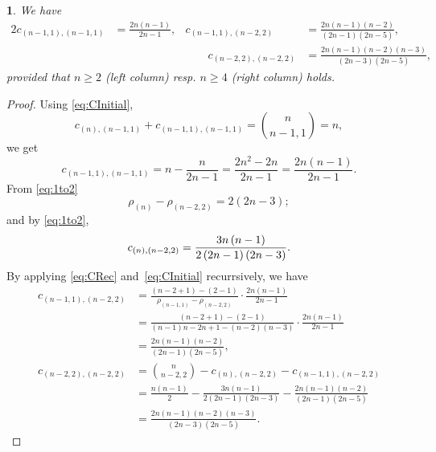 \documentclass[10pt,oneside,american]{amsart}
\numberwithin{equation}{section}
\numberwithin{figure}{section}
\theoremstyle{definition}
\theoremstyle{remark}
\theoremstyle{plain}
\theoremstyle{definition}
\theoremstyle{plain}
\newtheorem{thm}{\protect\theoremname}[section]
\theoremstyle{plain}
\theoremstyle{plain}
\providecommand{\theoremname}{Theorem}
\begin{document}
\begin{thm}
\label{thm:fam1}
We have
\begin{alignat*}{2}
  c_{(n-1,1),(n-1,1)} &= \frac{2n(n-1)}{2n-1}, &
  c_{(n-1,1),(n-2,2)} &= \frac{2n(n-1)(n-2)}{(2n-1)(2n-5)}, \\
  &&\qquad
  c_{(n-2,2),(n-2,2)} &= \frac{2n(n-1)(n-2)(n-3)}{(2n-3)(2n-5)},
\end{alignat*}
provided that $n\geq2$ (left column) resp. $n\geq4$ (right column) holds.
\end{thm}
\begin{proof}
Using \eqref{eq:CInitial},
\[
  c_{\left(n\right),\left(n-1,1\right)}+c_{\left(n-1,1\right),\left(n-1,1\right)}=\binom{n}{n-1,1}=n,
\]
we get
\[
  c_{\left(n-1,1\right),\left(n-1,1\right)}=n-\frac{n}{2n-1}=\frac{2n^{2}-2n}{2n-1}=\frac{2n\left(n-1\right)}{2n-1}.
\]
From \eqref{eq:1to2} 
\[
  \rho_{\left(n\right)}-\rho_{\left(n-2,2\right)} =2\left(2n-3\right);
\]
and by \eqref{eq:1to2}, 
\[
 c_{\left(n\right),\left(n-2,2\right)} =\frac{3n\left(n-1\right)}{2\left(2n-1\right)\left(2n-3\right)}.\\
\]
By applying \eqref{eq:CRec} and~\eqref{eq:CInitial} recurrsively, we have
\begin{align*}
  c_{\left(n-1,1\right),\left(n-2,2\right)}
  &= \frac{\left(n-2+1\right)-\left(2-1\right)}{\rho_{\left(n-1,1\right)}-\rho_{\left(n-2,2\right)}}\cdot\frac{2n\left(n-1\right)}{2n-1}\\
  &= \frac{\left(n-2+1\right)-\left(2-1\right)}{\left(n-1\right)n-2n+1-\left(n-2\right)\left(n-3\right)}\cdot\frac{2n\left(n-1\right)}{2n-1}\\
  &= \frac{2n\left(n-1\right)\left(n-2\right)}{\left(2n-1\right)\left(2n-5\right)},\\
  c_{\left(n-2,2\right),\left(n-2,2\right)}
  &= \binom{n}{n-2,2}-c_{\left(n\right),\left(n-2,2\right)}-c_{\left(n-1,1\right),\left(n-2,2\right)}\\
  &= \frac{n\left(n-1\right)}{2}-\frac{3n\left(n-1\right)}{2\left(2n-1\right)\left(2n-3\right)}-\frac{2n\left(n-1\right)\left(n-2\right)}{\left(2n-1\right)\left(2n-5\right)}\\
  &= \frac{2n\left(n-1\right)\left(n-2\right)\left(n-3\right)}{\left(2n-3\right)\left(2n-5\right)}.
\end{align*}
\end{proof}
\end{document}
